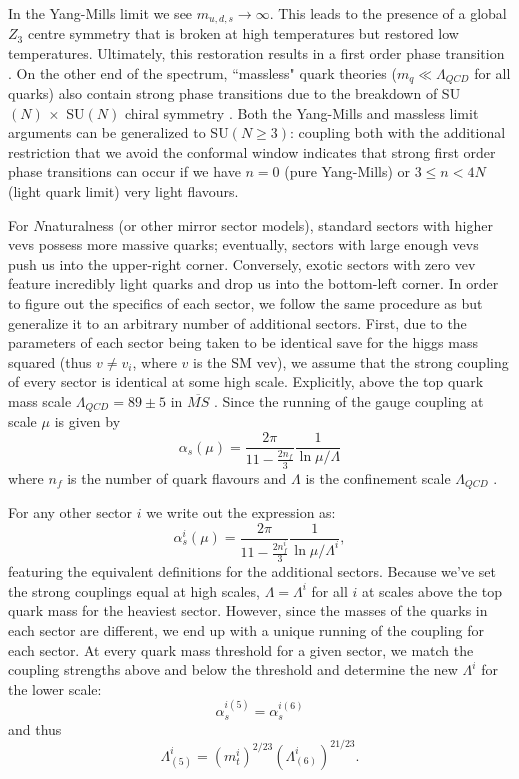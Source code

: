 \documentclass[nofootinbib,twocolumn,preprintnumbers]{revtex4-1}
\begin{document}
In the Yang-Mills limit we see $m_{u,d,s} \rightarrow \infty$. This leads to the presence of a global $Z_3$ centre symmetry that is broken at high temperatures but restored low temperatures. Ultimately, this restoration results in a first order phase transition \cite{SVETITSKY1982423}. On the other end of the spectrum, ``massless" quark theories ($m_q \ll \Lambda_{QCD}$ for all quarks) also contain strong phase transitions due to the breakdown of SU$(N)\,\times$ SU$(N)$ chiral symmetry \cite{Pisarski:1983ms}. Both the Yang-Mills and massless limit arguments can be generalized to SU$(N \geq 3)$: coupling both with the additional restriction that we avoid the conformal window indicates that strong first order phase transitions can occur if we have $n = 0$ (pure Yang-Mills) or $3 \leq n < 4N$ (light quark limit) very light flavours.

For $N$naturalness (or other mirror sector models), standard sectors with higher vevs possess more massive quarks; eventually, sectors with large enough vevs push us into the upper-right corner. Conversely, exotic sectors with zero vev feature incredibly light quarks and drop us into the bottom-left corner. In order to figure out the specifics of each sector, we follow  the same procedure as \cite{Cui:2011wk} but generalize it to an arbitrary number of additional sectors. First, due to the parameters of each sector being taken to be identical save for the higgs mass squared (thus $v \neq v_i$, where $v$ is the SM vev), we assume that the strong coupling of every sector is identical at some high scale. 
Explicitly, above the top quark mass scale $\Lambda_{QCD} = 89 \pm 5$ in $\overline{MS}$ \cite{PhysRevD.98.030001}. Since the running of the gauge coupling at scale $\mu$ is given by 
\begin{equation}\label{eqn:QCDrunning}
\alpha_s (\mu) = \frac{2\pi}{11-\frac{2n_f}{3}}\frac{1}{\ln{\mu/\Lambda}}
\end{equation} 
where $n_f$ is the number of quark flavours and $\Lambda$ is the confinement scale $\Lambda_{QCD}$ \cite{Peskin:1995ev}. 

For any other sector $i$ we write out the expression as: 
\begin{equation}\label{eqn:QCDrunningi}
\alpha_{s}^i (\mu) = \frac{2\pi}{11-\frac{2n^i_f}{3}}\frac{1}{\ln{\mu/\Lambda^i}},
\end{equation}
featuring the equivalent definitions for the additional sectors. Because we've set the strong couplings equal at high scales, $\Lambda = \Lambda^i$ for all $i$ at scales above the top quark mass for the heaviest sector. However, since the masses of the quarks in each sector are different, we end up with a unique running of the coupling for each sector. At every quark mass threshold for a given sector, we match the coupling strengths above and below the threshold and determine the new $\Lambda^i$ for the lower scale:
\begin{equation}
\alpha_s^{i(5)} = \alpha_s^{i(6)}
\end{equation} 
and thus
\begin{equation}
\Lambda_{(5)}^i = (m_t^{i})^{2/23}(\Lambda_{(6)}^i)^{21/23}.
\end{equation}
\end{document}
